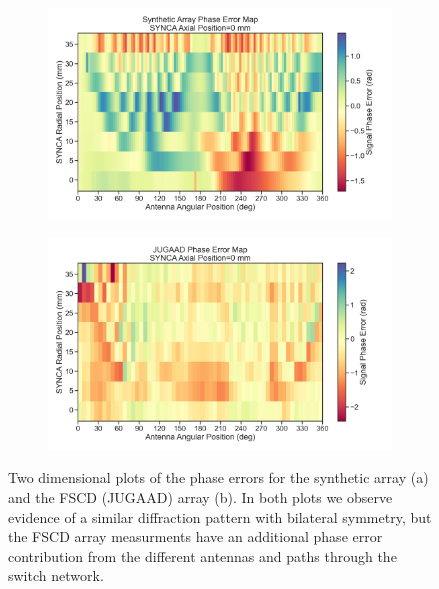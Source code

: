 \begin{figure}[h]
\centering
\begin{subfigure}{.7\textwidth}
  \centering
  \includegraphics[width=1\textwidth]{figs/Chapter-5/230120_synth_array_phase_error_map_z0.png}
  \caption{}
  \label{fig:jugaad_phase_map}
\end{subfigure}
\par\medskip %
\begin{subfigure}{.7\textwidth}
  \centering
  \includegraphics[width=1\textwidth]{figs/Chapter-5/230123_jugaad_phase_error_map_z0.png}
  \caption{}
  \label{fig:synth_jugaad_phase_map}
\end{subfigure}
\caption{Two dimensional plots of the phase errors for the synthetic array (a) and the FSCD (JUGAAD) array (b). In both plots we observe evidence of a similar diffraction pattern with bilateral symmetry, but the FSCD array measurments have an additional phase error contribution from the different antennas and paths through the switch network.}
\label{fig:jugaad_measured_phase_maps}
\end{figure}

